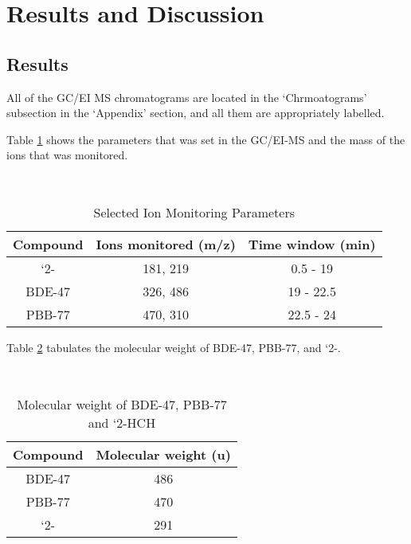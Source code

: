 \documentclass[a4paper, 12pt]{article}
\begin{document}

\section{Results and Discussion}

\subsection{Results}
All of the GC/EI MS chromatograms are located in the `Chrmoatograms' subsection in the `Appendix' section, and all them are appropriately labelled.

Table \ref{tab-para} shows the parameters that was set in the GC/EI-MS and the mass of the ions that was monitored.

\begin{table}[h!]
	\centering
	\caption{Selected Ion Monitoring Parameters}
	\hfill \\
	\begin{tabular}{|c|c|c|}
		\hline
		Compound & Ions monitored (m/z) & Time window (min) \\
		\hline
		`2-\ce{HCH} & 181, 219 & 0.5 - 19 \\
		\hline
		BDE-47 & 326, 486 & 19 - 22.5 \\
		\hline
		PBB-77 & 470, 310 & 22.5 - 24 \\
		\hline
	\end{tabular}
	\label{tab-para}
\end{table}

Table \ref{tab-mass} tabulates the molecular weight of BDE-47, PBB-77, and `2-.

\begin{table}[h!]
	\centering
	\caption{Molecular weight of BDE-47, PBB-77 and `2-HCH}
	\hfill \\
	\begin{tabular}{|c|c|}
		\hline
		Compound & Molecular weight (\si{\amu}) \\
		\hline
		BDE-47 & 486 \\
		\hline
		PBB-77 & 470 \\
		\hline
		`2-\ce{HCH} & 291 \\
		\hline
	\end{tabular}
	\label{tab-mass}
\end{table}
\end{document}

